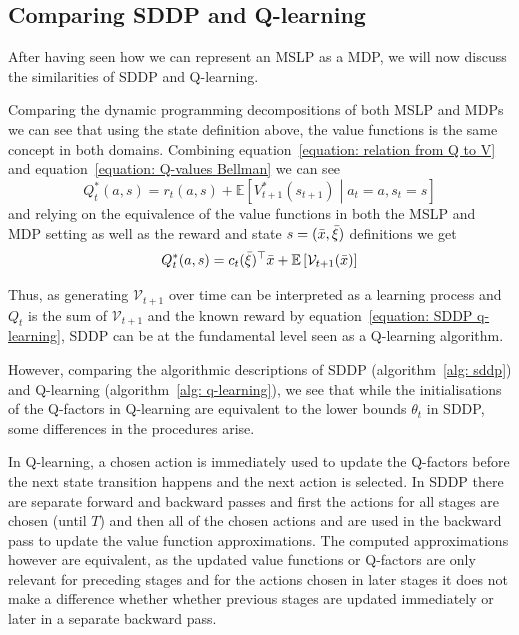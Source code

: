 \documentclass[a4paper,12pt]{article}
\newcommand{\E}{\mathbb{E}}
\begin{document}
\subsection{Comparing SDDP and Q-learning}

After having seen how we can represent an MSLP as a MDP, we will now discuss the similarities of SDDP and Q-learning.

Comparing the dynamic programming decompositions of both MSLP and MDPs we can see that using the state definition above, the value functions is the same concept in both domains. Combining equation~\eqref{equation: relation from Q to V} and equation~\eqref{equation: Q-values Bellman} 
we can see
\begin{equation}
    Q^*_t(a, s) = r_t(a, s) + \E \left[ V^*_{t+1}(s_{t+1}) \middle| a_t = a, s_t = s \right] 
\end{equation}
and relying on the equivalence of the value functions in both the MSLP and MDP setting as well as the reward and state $s = (\Bar{x},\Bar{\xi})$ definitions we get
\begin{equation}
    Q^*_t(a, s) = c_t(\Bar{\xi})^\top \Bar{x} + \E \left[ \mathcal{V}_{t+1}(\Bar{x}) \right] 
    \label{equation: SDDP q-learning}
\end{equation}

Thus, as generating $\mathcal{V}_{t+1}$ over time can be interpreted as a learning process and $Q_t$ is the sum of $\mathcal{V}_{t+1}$ and the known reward by equation~\eqref{equation: SDDP q-learning}, SDDP can be at the fundamental level seen as a Q-learning algorithm.

However, comparing the algorithmic descriptions of SDDP (algorithm~\ref{alg: sddp}) and Q-learning (algorithm~\ref{alg: q-learning}), we see that while the initialisations of the Q-factors in Q-learning are equivalent to the lower bounds $\theta_t$ in SDDP, some differences in the procedures arise.

In Q-learning, a chosen action is immediately used to update the Q-factors before the next state transition happens and the next action is selected. In SDDP there are separate forward and backward passes and first the actions for all stages are chosen (until $T$) and then all of the chosen actions and are used in the backward pass to update the value function approximations.
The computed approximations however are equivalent, as the updated value functions or Q-factors are only relevant for preceding stages and for the actions chosen in later stages it does not make a difference whether whether previous stages are updated immediately or later in a separate backward pass.
\end{document}
